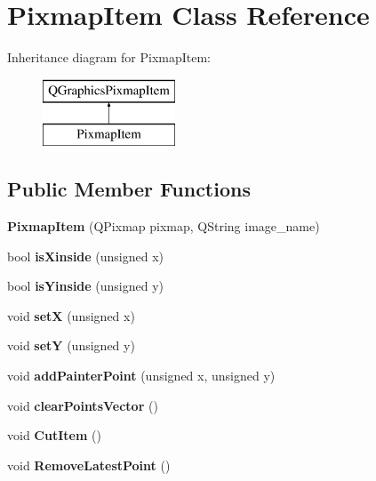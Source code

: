\hypertarget{classPixmapItem}{}\section{Pixmap\+Item Class Reference}
\label{classPixmapItem}
Inheritance diagram for Pixmap\+Item\+:\begin{figure}[H]
\begin{center}
\leavevmode
\includegraphics[height=2.000000cm]{classPixmapItem}
\end{center}
\end{figure}
\subsection*{Public Member Functions}
\begin{DoxyCompactItemize}
\item 
\mbox{\label{classPixmapItem_a7e339e581be3c4892d2af89494bd137c}} 
{\bfseries Pixmap\+Item} (Q\+Pixmap pixmap, Q\+String image\+\_\+name)
\item 
\mbox{\label{classPixmapItem_ad5510bf5a97b352e3b06cb888ac0a99c}} 
bool {\bfseries is\+Xinside} (unsigned x)
\item 
\mbox{\label{classPixmapItem_ab6e6526fd5cd0ce5ba34b665adca6c5c}} 
bool {\bfseries is\+Yinside} (unsigned y)
\item 
\mbox{\label{classPixmapItem_a692a0aca72ffbe102769fdc9246ed2f6}} 
void {\bfseries setX} (unsigned x)
\item 
\mbox{\label{classPixmapItem_a6c6f4a872823f585edcf134d9bf209e1}} 
void {\bfseries setY} (unsigned y)
\item 
\mbox{\label{classPixmapItem_a6e18b1223f61d40dba6e96f4da15ce5c}} 
void {\bfseries add\+Painter\+Point} (unsigned x, unsigned y)
\item 
\mbox{\label{classPixmapItem_a54810877049ab858d569f83065720a18}} 
void {\bfseries clear\+Points\+Vector} ()
\item 
\mbox{\label{classPixmapItem_a4a742318dce01d018da2f4b01790c210}} 
void {\bfseries Cut\+Item} ()
\item 
\mbox{\label{classPixmapItem_ae2e67a7b69ef10dc613e14c1d3c1a327}} 
void {\bfseries Remove\+Latest\+Point} ()
\end{DoxyCompactItemize}


